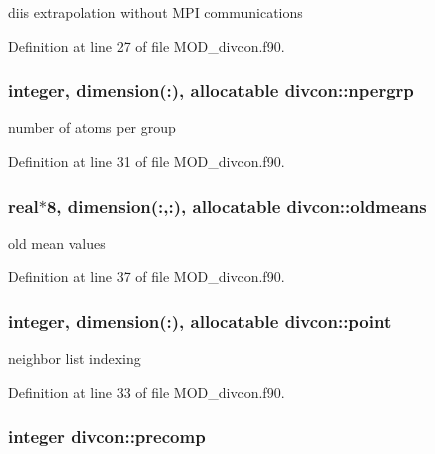diis extrapolation without M\-P\-I communications 



Definition at line 27 of file M\-O\-D\-\_\-divcon.\-f90.

\hypertarget{classdivcon_aaec5fcd38debfd444315b3f4eaaf901c}{
\subsubsection[{npergrp}]{\setlength{\rightskip}{0pt plus 5cm}integer, dimension(\-:), allocatable divcon\-::npergrp}}\label{classdivcon_aaec5fcd38debfd444315b3f4eaaf901c}


number of atoms per group 



Definition at line 31 of file M\-O\-D\-\_\-divcon.\-f90.

\hypertarget{classdivcon_ae489384938cb29894a602cbf5579eab9}{
\subsubsection[{oldmeans}]{\setlength{\rightskip}{0pt plus 5cm}real$\ast$8, dimension(\-:,\-:), allocatable divcon\-::oldmeans}}\label{classdivcon_ae489384938cb29894a602cbf5579eab9}


old mean values 



Definition at line 37 of file M\-O\-D\-\_\-divcon.\-f90.

\hypertarget{classdivcon_af984aacb47c91db0642bacadd4a7369b}{
\subsubsection[{point}]{\setlength{\rightskip}{0pt plus 5cm}integer, dimension(\-:), allocatable divcon\-::point}}\label{classdivcon_af984aacb47c91db0642bacadd4a7369b}


neighbor list indexing 



Definition at line 33 of file M\-O\-D\-\_\-divcon.\-f90.

\hypertarget{classdivcon_a558a265882b7e0d8303f780148834195}{
\subsubsection[{precomp}]{\setlength{\rightskip}{0pt plus 5cm}integer divcon\-::precomp}}\label{classdivcon_a558a265882b7e0d8303f780148834195}



